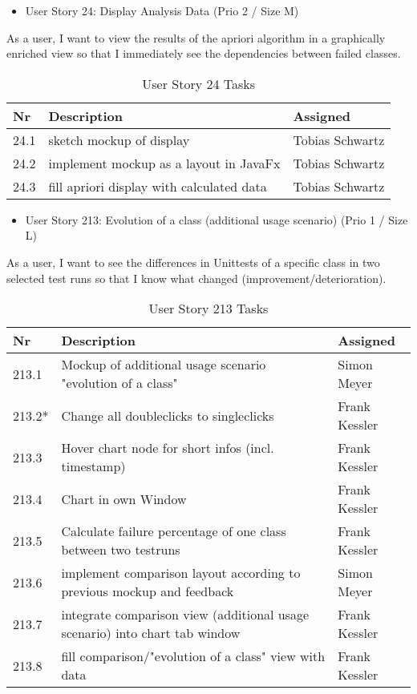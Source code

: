 \newpage
\begin{itemize}
	\item User Story 24: Display Analysis Data (Prio 2 / Size M)
	\end{itemize}
As a user,
I want to view the results of the apriori algorithm in a graphically enriched view
so that I immediately see the dependencies between failed classes.
\begin{table}[h]
  \caption{User Story 24 Tasks}
  \label{Story 24 Tasks}
  \centering
  \begin{tabular}{p{1cm}|p{5cm}|p{3cm}|}
  	Nr & Description & Assigned \\ 
  	\hline
  	24.1 & sketch mockup of display & Tobias Schwartz \\ 
  	\hline
  	24.2 & implement mockup as a layout in JavaFx & Tobias Schwartz \\ 
  	\hline
  	24.3 & fill apriori display with calculated data & Tobias Schwartz \\ 
  	\hline
  \end{tabular}
\end{table}

\begin{itemize}
	\item User Story 213: Evolution of a class (additional usage scenario) (Prio 1 / Size L)
	\end{itemize}
As a user,
I want to see the differences in Unittests of a specific class in two selected test runs
so that I know what changed (improvement/deterioration).
\begin{table}[h]
  \caption{User Story 213 Tasks}
  \label{Story 213 Tasks}
  \centering
  \begin{tabular}{p{1cm}|p{5cm}|p{3cm}|}
  	Nr & Description & Assigned \\ 
  	\hline
  	213.1 & Mockup of additional usage scenario "evolution of a class" & Simon Meyer \\ 
  	\hline
  	213.2* & Change all doubleclicks to singleclicks & Frank Kessler \\ 
  	\hline
  	213.3 & Hover chart node for short infos (incl. timestamp) & Frank Kessler \\ 
  	\hline
  	213.4 & Chart in own Window & Frank Kessler \\ 
  	\hline
  	213.5 & Calculate failure percentage of one class between two testruns & Frank Kessler \\ 
  	\hline
  	213.6 & implement comparison layout according to previous mockup and feedback & Simon Meyer \\ 
  	\hline
  	213.7 & integrate comparison view (additional usage scenario) into chart tab window & Frank Kessler \\ 
  	\hline
  	213.8 & fill comparison/"evolution of a class" view with data & Frank Kessler \\ 
  	\hline
  \end{tabular}
\end{table}


